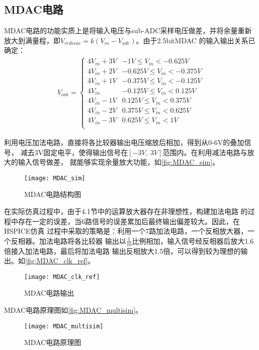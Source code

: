 \subsection{MDAC电路}
    MDAC电路的功能实质上是将输入电压与sub-ADC采样电压做差，并将余量重新
    放大到满量程，即$ V_{redisue} = k(V_{in} - V_{adc}) $。由于2.5bitMDAC
    的输入输出关系已确定：
    \begin{align}
        V_{\text {out}}=
        \left\{
        \begin{array}{ccc}
            4V_{in} + 3V & -1V \leq V_{in} < -0.625V \\
            4V_{in} + 2V & -0.625V \leq V_{in} < -0.375V \\
            4V_{in} + 1V & -0.375V \leq V_{in} < -0.125V \\
            4V_{in} & -0.125V \leq V_{in} < 0.125V \\
            4V_{in} - 1V & 0.125V \leq V_{in} < 0.375V \\
            4V_{in} - 2V & 0.375V \leq V_{in} < 0.625V \\
            4V_{in} - 3V & 0.625V \leq V_{in} < 1V \\
       \end{array}
        \right.
    \end{align}
    \par 利用电压加法电路，直接将各比较器输出电压缩放后相加，得到从0-6V的叠加信号，
    减去3V固定电平，使得输出信号在$[-3V,\ 3V]$范围内。在利用减法电路与放大的输入信号做差，
    就能够实现余量放大功能，如\autoref{fig:MDAC_sim}。
    \begin{figure}[ht]
        \centering
        \texttt{[image: MDAC\_sim]}
        \caption{\label{fig:MDAC_sim}MDAC电路结构图}
    \end{figure}
    \par 在实际仿真过程中，由于4.1节中的运算放大器存在非理想性，构建加法电路
    的过程中存在一定的误差，当6路信号的误差累加后最终输出偏差较大。因此，在HSPICE仿真
    过程中采取的策略是：利用一个7路加法电路，一个反相放大器，一个反相器。加法电路将各比较器
    输出以$ \frac{1}{10} $比例相加，输入信号经反相器后放大1.6倍接入加法电路，最后将加法电路
    输出反相放大1.5倍，可以得到较为理想的输出。如\autoref{fig:MDAC_clk_ref}。
    \begin{figure}[H]
        \centering
        \texttt{[image: MDAC\_clk\_ref]}
        \caption{\label{fig:MDAC_clk_ref}MDAC电路输出}
    \end{figure}
    \par MDAC电路原理图如\autoref{fig:MDAC_multisim}。
    \begin{figure}[H]
        \centering
        \texttt{[image: MDAC\_multisim]}
        \caption{\label{fig:MDAC_multisim}MDAC电路原理图}
    \end{figure}

